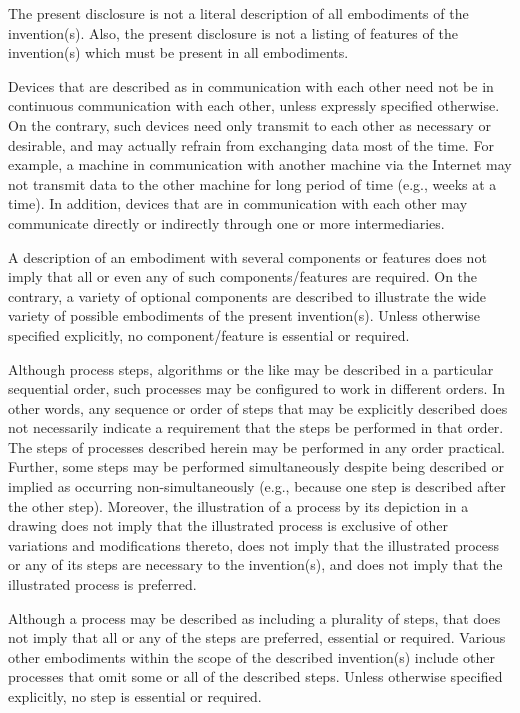 \documentclass[11pt,a4paper]{article}
\begin{document}
The present disclosure is not a literal description of all embodiments of the invention(s). Also, the present disclosure is not a listing of features of the invention(s) which must be present in all embodiments.

Devices that are described as in communication with each other need not be in continuous communication with each other, unless expressly specified otherwise. On the contrary, such devices need only transmit to each other as necessary or desirable, and may actually refrain from exchanging data most of the time. For example, a machine in communication with another machine via the Internet may not transmit data to the other machine for long period of time (e.g., weeks at a time). In addition, devices that are in communication with each other may communicate directly or indirectly through one or more intermediaries.

A description of an embodiment with several components or features does not imply that all or even any of such components/features are required. On the contrary, a variety of optional components are described to illustrate the wide variety of possible embodiments of the present invention(s). Unless otherwise specified explicitly, no component/feature is essential or required.

Although process steps, algorithms or the like may be described in a particular sequential order, such processes may be configured to work in different orders. In other words, any sequence or order of steps that may be explicitly described does not necessarily indicate a requirement that the steps be performed in that order. The steps of processes described herein may be performed in any order practical. Further, some steps may be performed simultaneously despite being described or implied as occurring non-simultaneously (e.g., because one step is described after the other step). Moreover, the illustration of a process by its depiction in a drawing does not imply that the illustrated process is exclusive of other variations and modifications thereto, does not imply that the illustrated process or any of its steps are necessary to the invention(s), and does not imply that the illustrated process is preferred.

Although a process may be described as including a plurality of steps, that does not imply that all or any of the steps are preferred, essential or required. Various other embodiments within the scope of the described invention(s) include other processes that omit some or all of the described steps. Unless otherwise specified explicitly, no step is essential or required.
\end{document}

